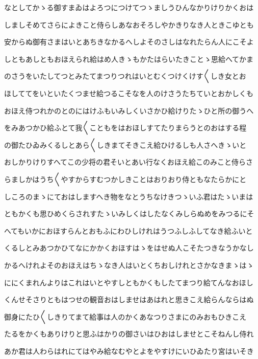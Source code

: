 \documentclass[a4paper,11pt,landscape]{ltjtarticle}
\begin{document}
\par\medskip
なとしてかゝる御すまゐはよろつにつけてつゝましうひんなかりけりかくおは
\par\medskip
しましそめてさらによきこと侍らしあなおそろしやかきりなき人ときこゆとも
\par\medskip
安からぬ御有さまはいとあちきなかるへしよそのさしはなれたらん人にこそよ
\par\medskip
しともあしともおほえられ給はめ人きゝもかたはらいたきことゝ思給へてかま
\par\medskip
のさうをいたしてつとみたてまつりつれはいとむくつけくけす〱しき女とお
\par\medskip
ほしててをいといたくつませ給つるこそなを人のけさうたちていとおかしくも
\par\medskip
おほえ侍つれかのとのにはけふもいみしくいさかひ給けりたゝひと所の御うへ
\par\medskip
をみあつかひ給ふとて我〱こともをはおほしすてたりまらうとのおはする程
\par\medskip
の御たひゐみくるしとあら〱しきまてそきこえ給ひけるしも人さへきゝいと
\par\medskip
おしかりけりすへてこの少将の君そいとあい行なくおほえ給このみこと侍らさ
\par\medskip
らましかはうち〱やすからすむつかしきことはおりおり侍ともなたらかにと
\par\medskip
しころのまゝにておはしますへき物をなとうちなけきつゝいふ君はたゝいまは
\par\medskip
ともかくも思ひめくらされすたゝいみしくはしたなくみしらぬめをみつるにそ
\par\medskip
へてもいかにおほすらんとおもふにわひしけれはうつふしふしてなき給ふいと
\par\medskip
くるしとみあつかひてなにかかくおほすはゝをはせぬ人こそたつきなうかなし
\par\medskip
かるへけれよそのおほえはちゝなき人はいとくちおしけれとさかなきまゝはゝ
\par\medskip
ににくまれんよりはこれはいとやすしともかくもしたてまつり給てんなおほし
\par\medskip
くんせそさりともはつせの観音おはしませはあはれと思きこえ給らんならはぬ
\par\medskip
御身にたひ〱しきりてまて給事は人のかくあなつりさまにのみおもひきこえ
\par\medskip
たるをかくもありけりと思ふはかりの御さいはひおはしませとこそねんし侍れ
\par\medskip
あか君は人わらはれにてはやみ給なむやとよをやすけにいひゐたり宮はいそき
\par\medskip
\end{document}
